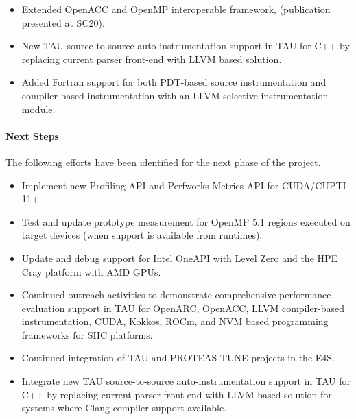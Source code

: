 \begin{itemize}
\item %
Extended OpenACC and OpenMP interoperable framework, (publication presented at SC20).

\item %
New TAU source-to-source auto-instrumentation support in TAU for C++ by replacing current parser front-end with LLVM based solution.

\item %
Added Fortran support for both PDT-based source instrumentation and compiler-based instrumentation with an LLVM selective instrumentation module.

\end{itemize}

\paragraph{Next Steps}
The following efforts have been identified for the next phase of the project.

\begin{itemize}
\item %
Implement new Profiling API and Perfworks Metrics API for CUDA/CUPTI 11+.

\item %
Test and update prototype measurement for OpenMP 5.1 regions executed on target devices (when support is available from runtimes).

\item %
Update and debug support for Intel OneAPI with Level Zero and the HPE Cray platform with AMD GPUs.

\item %
Continued outreach activities to demonstrate comprehensive performance evaluation support in TAU for OpenARC, OpenACC, LLVM compiler-based instrumentation, CUDA, Kokkos, ROCm, and NVM based programming frameworks for SHC platforms.

\item %
Continued integration of TAU and PROTEAS-TUNE projects in the E4S.

\item %
Integrate new TAU source-to-source auto-instrumentation support in TAU for C++ by replacing current parser front-end with LLVM based solution for systems where Clang compiler support available.

\end{itemize}
